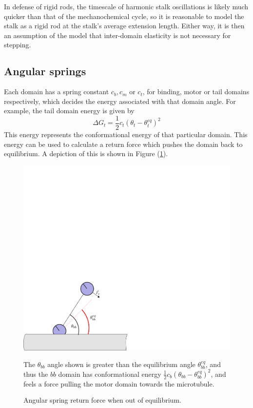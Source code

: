 \documentclass[
11pt, %
english, %
singlespacing, %
headsepline, %
chapterinoneline, %
]{MastersDoctoralThesis} %
\begin{document}
In defense of rigid rods, the timescale of harmonic stalk oscillations is likely much quicker than that of the mechanochemical cycle, so it is reasonable to model the stalk as a rigid rod at the stalk's average extension length. Either way, it is then an assumption of the model that inter-domain elasticity is not necessary for stepping.\\

\subsection{Angular springs}
Each domain has a spring constant $c_b, c_m$ or $c_t$, for binding, motor or tail domains respectively, which decides the energy associated with that domain angle. For example, the tail domain energy is given by
%
\begin{equation}
  \Delta G_t = \frac12c_t\left(\theta_t - \theta_t^{eq}\right)^2
\end{equation}
%
This energy represents the conformational energy of that particular domain. This energy can be used to calculate a return force which pushes the domain back to equilibrium. A depiction of this is shown in Figure (\ref{fig:angular-spring}).\\

\begin{figure}[h]
  \centering
  \includegraphics[width=.65\textwidth]{../../figures/angular-spring}
  \caption{Angular spring return force when out of equilibrium.}{The $\theta_{bb}$ angle shown is greater than the equilibrium angle $\theta_{bb}^{eq}$, and thus the $bb$ domain has conformational energy $\frac{1}{2}c_b\left(\theta_{bb}-\theta_{bb}^{eq}\right)^2$, and feels a force pulling the motor domain towards the microtubule.}
  \label{fig:angular-spring}
\end{figure}
\end{document}
